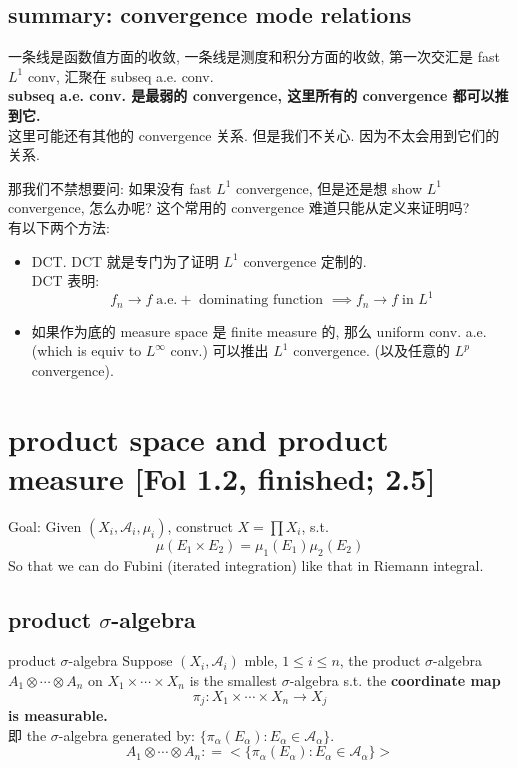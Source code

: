 \documentclass[lang=cn,11pt]{elegantbook}
\begin{document}
\section{summary: convergence mode relations}
一条线是函数值方面的收敛, 一条线是测度和积分方面的收敛,  第一次交汇是 fast $L^1$ conv, 汇聚在 subseq a.e. conv. \\
\textbf{subseq a.e. conv. 是最弱的 convergence, 这里所有的 convergence 都可以推到它.}\\
这里可能还有其他的 convergence 关系. 但是我们不关心. 因为不太会用到它们的关系.
\begin{remark}
    那我们不禁想要问: 如果没有 fast $L^1$ convergence, 但是还是想 show $L^1$ convergence, 怎么办呢? 这个常用的 convergence 难道只能从定义来证明吗?\\
有以下两个方法:
\begin{itemize}
    \item DCT. DCT 就是专门为了证明 $L^1$ convergence 定制的.\\
    DCT 表明: \[
  f_n\to f  \; \text{a.e.} + \text{ dominating function } \implies f_n \to f \; \text{in } L^1
    \]
    \item 如果作为底的 measure space 是 finite measure 的, 那么 uniform conv. a.e. (which is equiv to $L^\infty$ conv.) 可以推出 $L^1$ convergence. (以及任意的 $L^p$ convergence).

\end{itemize}
\end{remark}




\chapter{product space and product measure [Fol 1.2, finished; 2.5]}

Goal: Given $(X_i, \mathcal{A}_i, \mu_i)$, construct $X = \prod X_i $, s.t. 
\[
\mu(E_1 \times E_2 )  = \mu_1(E_1) \mu_2(E_2)
\]
So that we can do Fubini (iterated integration) like that in Riemann integral.


\section{product $\sigma$-algebra}
\begin{definition}{product $\sigma$-algebra}
Suppose $(X_i, \mathcal{A}_i)$ mble, $1 \leq i\leq n$, the product $\sigma$-algebra $A_1 \otimes \cdots \otimes A_n$ on $X_1 \times \cdots \times X_n$ is the smallest $\sigma$-algebra s.t. the\textbf{ coordinate map }$$ \pi_j: X_1 \times \cdots \times X_n \rightarrow X_j$$\textbf{is measurable.}\\
即 the $\sigma$-algebra generated by: \(
\{  \pi_\alpha (E_\alpha) : E_\alpha  \in \mathcal{A_\alpha} \}
\). \[
A_1 \otimes \cdots \otimes A_n : = <\{  \pi_\alpha (E_\alpha) : E_\alpha  \in \mathcal{A_\alpha} \}>
\]

\end{definition}
\end{document}
